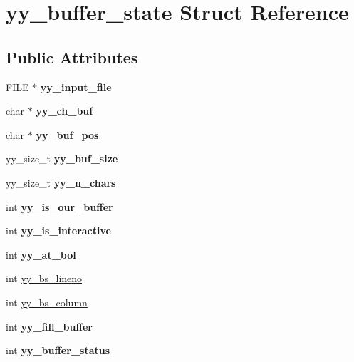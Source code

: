 \hypertarget{structyy__buffer__state}{}\section{yy\+\_\+buffer\+\_\+state Struct Reference}
\label{structyy__buffer__state}
\subsection*{Public Attributes}
\begin{DoxyCompactItemize}
\item 
\mbox{\label{structyy__buffer__state_a4360acfb226a1fc240ab2be17dd6beda}} 
F\+I\+LE $\ast$ {\bfseries yy\+\_\+input\+\_\+file}
\item 
\mbox{\label{structyy__buffer__state_a0d25458e69eb22207fc633a1255d099d}} 
char $\ast$ {\bfseries yy\+\_\+ch\+\_\+buf}
\item 
\mbox{\label{structyy__buffer__state_a8435c3f786bbb55d21d0174e4cfc22a0}} 
char $\ast$ {\bfseries yy\+\_\+buf\+\_\+pos}
\item 
\mbox{\label{structyy__buffer__state_a48302f5f3477a9c78bbddf56d356ef54}} 
yy\+\_\+size\+\_\+t {\bfseries yy\+\_\+buf\+\_\+size}
\item 
\mbox{\label{structyy__buffer__state_afcc44872643f513e79b43c2b1f334a67}} 
yy\+\_\+size\+\_\+t {\bfseries yy\+\_\+n\+\_\+chars}
\item 
\mbox{\label{structyy__buffer__state_a80ce2431c70dc4f89ced487f18449465}} 
int {\bfseries yy\+\_\+is\+\_\+our\+\_\+buffer}
\item 
\mbox{\label{structyy__buffer__state_abf5c70eea75581b58c0ee7bd31b14490}} 
int {\bfseries yy\+\_\+is\+\_\+interactive}
\item 
\mbox{\label{structyy__buffer__state_a9d60c60af6e1a6f69de16871fd64f85f}} 
int {\bfseries yy\+\_\+at\+\_\+bol}
\item 
int \mbox{\hyperlink{structyy__buffer__state_a818e94bc9c766e683c60df1e9fd01199}{yy\+\_\+bs\+\_\+lineno}}
\item 
int \mbox{\hyperlink{structyy__buffer__state_a10c4fcd8be759e6bf11e6d3e8cdb0307}{yy\+\_\+bs\+\_\+column}}
\item 
\mbox{\label{structyy__buffer__state_a63d2afbb1d79a3fc63df9e12626f827d}} 
int {\bfseries yy\+\_\+fill\+\_\+buffer}
\item 
\mbox{\label{structyy__buffer__state_a70fd925d37a2f0454fbd0def675d106c}} 
int {\bfseries yy\+\_\+buffer\+\_\+status}
\end{DoxyCompactItemize}


